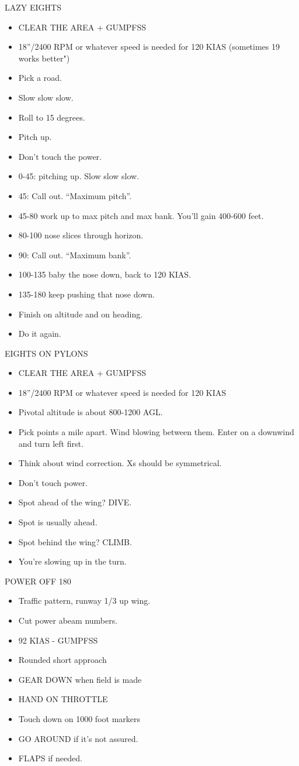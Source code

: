 LAZY EIGHTS
\begin{itemize}
    \item CLEAR THE AREA + GUMPFSS
    \item 18”/2400 RPM or whatever speed is needed for 120 KIAS (sometimes 19 works better")
    \item Pick a road.
    \item Slow slow slow.
    \item Roll to 15 degrees.
    \item Pitch up.
    \item Don’t touch the power.
    \item 0-45: pitching up. Slow slow slow.
    \item 45: Call out. ``Maximum pitch''.
    \item 45-80 work up to max pitch and max bank. You’ll gain 400-600 feet.
    \item 80-100 nose slices through horizon.
    \item 90: Call out. ``Maximum bank''.
    \item 100-135 baby the nose down, back to 120 KIAS.
    \item 135-180 keep pushing that nose down.
    \item Finish on altitude and on heading.
    \item Do it again.
\end{itemize}

EIGHTS ON PYLONS
\begin{itemize}
    \item CLEAR THE AREA + GUMPFSS
    \item 18”/2400 RPM or whatever speed is needed for 120 KIAS
    \item Pivotal altitude is about 800-1200 AGL.
    \item Pick points a mile apart. Wind blowing between them. Enter on a downwind and turn left first.
    \item Think about wind correction. Xs should be symmetrical.
    \item Don’t touch power.
    \item Spot ahead of the wing? DIVE.
    \item Spot is usually ahead.
    \item Spot behind the wing? CLIMB.
    \item You’re slowing up in the turn.
\end{itemize}

POWER OFF 180
\begin{itemize}
    \item Traffic pattern, runway 1/3 up wing.
    \item Cut power abeam numbers.
    \item 92 KIAS - GUMPFSS
    \item Rounded short approach
    \item GEAR DOWN when field is made
    \item HAND ON THROTTLE
    \item Touch down on 1000 foot markers
    \item GO AROUND if it’s not assured.
    \item FLAPS if needed.
\end{itemize}

